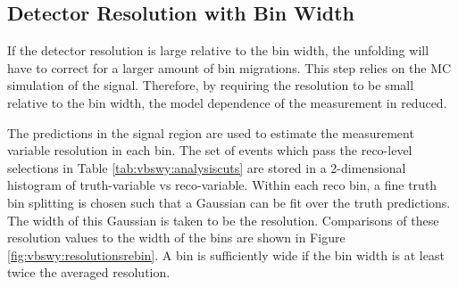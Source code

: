 \subsection{Detector Resolution with Bin Width}

If the detector resolution is large relative to the bin width, the unfolding will have to correct for a larger amount of bin migrations. This step relies on the MC simulation of the signal. Therefore, by requiring the resolution to be small relative to the bin width, the model dependence of the measurement in reduced. 

The \ewwy predictions in the signal region are used to estimate the measurement variable resolution in each bin. The set of events which pass the reco-level selections in Table \ref{tab:vbswy:analysiscuts} are stored in a 2-dimensional histogram of truth-variable vs reco-variable. Within each reco bin, a fine truth bin splitting is chosen such that a Gaussian can be fit over the truth predictions. The width of this Gaussian is taken to be the resolution. Comparisons of these resolution values to the width of the bins are shown in Figure \ref{fig:vbswy:resolutionsrebin}. A bin is sufficiently wide if the bin width is at least twice the averaged resolution.

